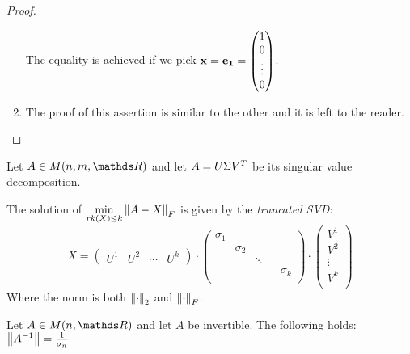 \documentclass[computationalMathematics.tex]{subfiles}
\begin{document}
\begin{proof}
\begin{enumerate}
  The equality is achieved if we pick ${\bf x } = {\bf e_1 } = \begin{pmatrix}
    1\\
    0\\
    \vdots\\
    0\\
  \end{pmatrix}$.
    \item The proof of this assertion is similar to the other and it is left to the reader.
    \end{enumerate}
\end{proof}

\begin{theorem}
  Let $A \in M(n, m, \R)$ and let $A = U \Sigma {V}^{T}$ be its singular value decomposition.

  The solution of $\min\limits_{rk(X) \le k} \left\lVert A-X\right\rVert_F$ is given by the \emph{truncated SVD}:
  \[
    X = \begin{pmatrix}
      U^1 & U^2 & \cdots & U^k
    \end{pmatrix}
    \cdot
    \begin{pmatrix}
    \sigma_1\\
    & \sigma_2\\
    && \ddots\\
    &&&& \sigma_k\\
    \end{pmatrix}
    \cdot
    \begin{pmatrix}
      V^1\\
      V^2\\
      \vdots\\
      V^k\\
    \end{pmatrix}
  \]
  Where the norm is both $\left\lVert\cdot\right\rVert_2$ and $\left\lVert\cdot\right\rVert_F$.
\end{theorem}

\begin{proposition}
  Let $A \in M(n, \R)$ and let $A$ be invertible. The following holds:
$  \left\lVert{A}^{-1}\right\rVert = \frac{1}{\sigma_n}$
\end{proposition}
\end{document}
